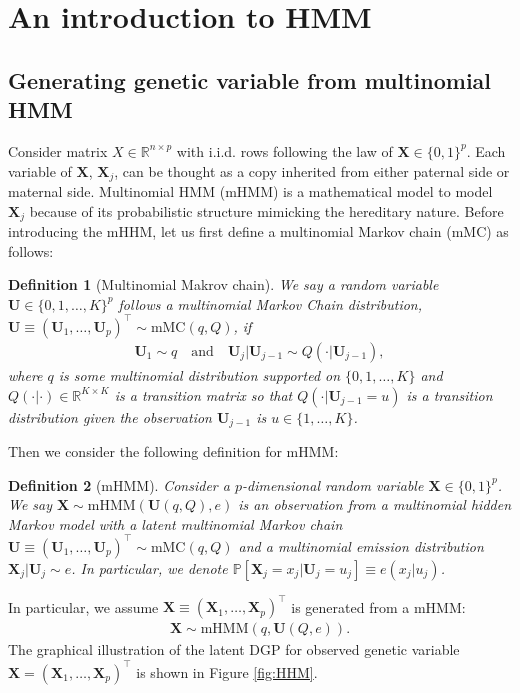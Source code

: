 \documentclass[12pt]{article}
\newtheorem{definition}{Definition}
\theoremstyle{definition}
\def\P{\mathbb{P}}
\def\P{\mathbb{P}}
\renewcommand{\P}{\mathbb{P}}							%
\newcommand{\prx}{\bm X}								%
\newcommand{\pru}{{\bm U}}								%
\begin{document}
\section{An introduction to HMM}\label{sec:HMM}


\subsection{Generating genetic variable from multinomial HMM}\label{sec:gen_snp}

Consider matrix $X\in\mathbb{R}^{n\times p}$ with i.i.d. rows following the law of $\prx\in\{0,1\}^p$. Each variable of $\prx$, $\prx_j$, can be thought as a copy inherited from either paternal side or maternal side. Multinomial HMM (mHMM) is a mathematical model to model $\prx_j$ because of its probabilistic structure mimicking the hereditary nature. Before introducing the mHHM, let us first define a multinomial Markov chain (mMC) as follows:

\begin{definition}[Multinomial Makrov chain]\label{def:Markov_chain}
	We say a random variable $\pru\in\{0,1,\ldots,K\}^p$ follows a multinomial Markov Chain distribution, $\pru\equiv (\pru_1,\ldots,\pru_p)^\top \sim \text{mMC}(q,Q)$, if 
	\begin{align*}
		\pru_1\sim q\quad\text{and}\quad \pru_{j}|\pru_{j-1}\sim Q(\cdot|\pru_{j-1}),
	\end{align*}
	where $q$ is some multinomial distribution supported on $\{0,1,\ldots,K\}$ and $Q(\cdot|\cdot)\in\mathbb{R}^{K\times K}$ is a transition matrix so that $Q(\cdot|\pru_{j-1}=u)$ is a transition distribution given the observation $\pru_{j-1}$ is $u\in\{1,\ldots,K\}$.
\end{definition}
Then we consider the following definition for mHMM:
\begin{definition}[mHMM]\label{def:mhhm}
	Consider a $p$-dimensional random variable $\bm X\in\{0,1\}^p$. We say $\bm X\sim \text{mHMM}(\pru(q,Q),e)$ is an observation from a multinomial hidden Markov model with a latent \textit{multinomial Markov chain} $\bm U\equiv (\pru_1,\ldots,\pru_p)^\top \sim \text{mMC}(q,Q)$ and a multinomial emission distribution $\bm X_j|\pru_j\sim e$. In particular, we denote $\P[\bm X_j=x_j|\pru_j=u_j]\equiv e(x_j|u_j)$.
\end{definition}
\noindent In particular, we assume $\prx\equiv (\prx_1,\ldots,\prx_p)^\top$ is generated from a mHMM:
\begin{align*}
	\prx\sim \text{mHMM}(q,\pru(Q,e)).
\end{align*}
The graphical illustration of the latent DGP for observed genetic variable $\prx=(\prx_1,\ldots,\prx_p)^\top$ is shown in Figure \ref{fig:HHM}.
\end{document}
